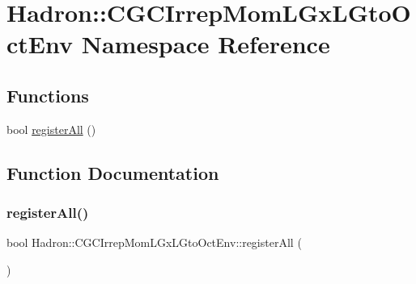 \hypertarget{namespaceHadron_1_1CGCIrrepMomLGxLGtoOctEnv}{}\section{Hadron\+:\+:C\+G\+C\+Irrep\+Mom\+L\+Gx\+L\+Gto\+Oct\+Env Namespace Reference}
\label{namespaceHadron_1_1CGCIrrepMomLGxLGtoOctEnv}
\subsection*{Functions}
\begin{DoxyCompactItemize}
\item 
bool \mbox{\hyperlink{namespaceHadron_1_1CGCIrrepMomLGxLGtoOctEnv_af4080789e3dc09dd752e71cb20ff3cb7}{register\+All}} ()
\end{DoxyCompactItemize}


\subsection{Function Documentation}
\mbox{\label{namespaceHadron_1_1CGCIrrepMomLGxLGtoOctEnv_af4080789e3dc09dd752e71cb20ff3cb7}} 
\subsubsection{\texorpdfstring{registerAll()}{registerAll()}}
{\footnotesize\ttfamily bool Hadron\+::\+C\+G\+C\+Irrep\+Mom\+L\+Gx\+L\+Gto\+Oct\+Env\+::register\+All (\begin{DoxyParamCaption}{ }\end{DoxyParamCaption})}

